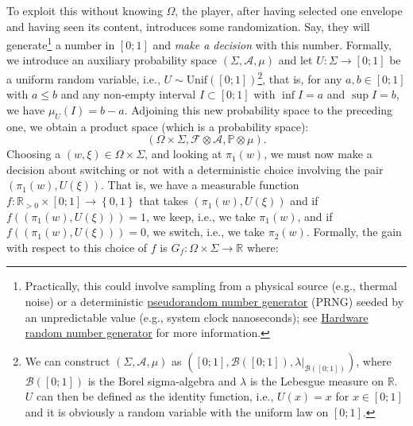 \begin{solution}
    To exploit this without knowing \( \Omega \), the player, after having selected one envelope and having seen its content, introduces some randomization. Say, they will generate\footnote{Practically, this could involve sampling from a physical source (e.g., thermal noise) or a deterministic \href{https://en.wikipedia.org/wiki/Pseudorandom_number_generator}{pseudorandom number generator} (PRNG) seeded by an unpredictable value (e.g., system clock nanoseconds); see \href{https://en.wikipedia.org/wiki/Hardware_random_number_generator}{Hardware random number generator} for more information.} a number in \( \left[0;1\right] \) and \textit{make a decision} with this number. Formally, we introduce an auxiliary probability space \( \left(\Sigma,\mathcal{A},\mu\right) \) and let \( U:\Sigma\rightarrow\left[0;1\right] \) be a uniform random variable, i.e., \( U \sim \text{Unif}\left(\left[0;1\right]\right) \)\footnote{We can construct \( \left(\Sigma,\mathcal{A},\mu\right) \) as \( \left(\left[0;1\right],\mathcal{B}\left(\left[0;1\right]\right),\lambda|_{\mathcal{B}\left(\left[0;1\right]\right)}\right) \), where \( \mathcal{B}\left(\left[0;1\right]\right) \) is the Borel sigma-algebra and \( \lambda \) is the Lebesgue measure on \( \mathbb{R} \). \( U \) can then be defined as the identity function, i.e., \( U\left(x\right) = x \) for \( x \in \left[0;1\right] \) and it is obviously a random variable with the uniform law on \( \left[0;1\right] \).}, that is, for any \( a,b \in\left[0;1\right] \) with \( a\leq b \) and any non-empty interval \( I\subset \left[0;1\right] \) with \( \inf I=a \) and \( \sup I=b \), we have \( \mu_{U}\left(I\right)= b-a \). Adjoining this new probability space to the preceding one, we obtain a product space (which is a probability space):
    \[
        \left(\Omega\times\Sigma,\mathcal{F}\otimes\mathcal{A},\mathbb{P}\otimes\mu\right).
    \]
    Choosing a \( \left(w,\xi\right)\in \Omega\times\Sigma \), and looking at \( \pi_1\left(w\right) \), we must now make a decision about switching or not with a deterministic choice involving the pair \( \left(\pi_1\left(w\right),U\left(\xi\right)\right) \). That is, we have a measurable function \( f:\mathbb{R}_{>0}\times\left[0;1\right]\rightarrow\left\{0,1\right\} \) that takes \( \left(\pi_1\left(w\right),U\left(\xi\right)\right) \) and if \( f\left(\left(\pi_{1}\left(w\right),U\left(\xi\right)\right)\right)=1 \), we keep, i.e., we take \( \pi_1\left(w\right) \), and if \( f\left(\left(\pi_{1}\left(w\right),U\left(\xi\right)\right)\right)=0 \), we switch, i.e., we take \( \pi_2\left(w\right) \). Formally, the gain with respect to this choice of \( f \) is \( G_f:\Omega\times\Sigma\rightarrow\mathbb{R} \) where:

\end{solution}
